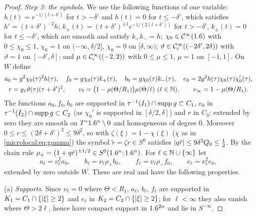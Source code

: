 \begin{proof}
  \emph{Step 3: the symbols.} We use the following functions of one variable:
  $h(t)=e^{-1/(t+\delta')}$ for $t>-\delta'$ and $h(t)=0$ for $t\le-\delta'$, which
  satisfies $h'=(t+\delta')^{-2}h$; $k_\pm(t)=(t+\delta')^{\pm1}e^{-1/(2(t+\delta'))}$ for
  $t>-\delta'$, $k_\pm(t)=0$ for $t\le-\delta'$, which are smooth and satisfy
  $k_+k_-=h$; $\chi_0\in\mathcal{C}^\infty(1.6)$ with $0\le\chi_0\le1$, $\chi_0=1$ on
  $(-\infty,\delta/2]$, $\chi_0=0$ on $[\delta,\infty)$; $\vartheta\in\mathcal{C}^\infty_{\mathrm{c}}((-2\delta',2\delta))$
  with $\vartheta=1$ on $[-\delta',\delta]$; and $\mu\in\mathcal{C}^\infty_{\mathrm{c}}((-2,2))$ with $0\le\mu\le1$,
  $\mu=1$ on $[-1,1]$. On $W$ define
  \begin{gather*}
    a_0=g^2\chi_0(\tau)^2h(\tau),\quad f_0=g\chi_0(\tau)k_+(\tau),\quad
    b_0=g\chi_0(\tau)k_-(\tau),\quad e_0=2g^2h(\tau)\chi_0(\tau)\chi_0'(\tau),\\
    r=g_1\vartheta(\tau)(\tau+\delta')^2,\qquad
    \nu_\ell=\bigl(1-\mu(\Theta/R_1)\bigr)\mu(\Theta/\ell)\ (\ell\in\N),\qquad
    \nu_\infty=1-\mu(\Theta/R_1).
  \end{gather*}
  The functions $a_0,f_0,b_0$ are supported in $\tau^{-1}(I_1)\cap\operatorname{supp} g\subset C_1$,
  $e_0$ in $\tau^{-1}(I_2)\cap\operatorname{supp} g\subset C_2$ (as $\chi_0'$ is supported in
  $[\delta/2,\delta]$) and $r$ in $C_3$; extended by zero they are smooth on
  $T^*1.6^n\setminus0$ and homogeneous of degree $0$. Moreover
  $0\le r\le(2\delta+\delta')^2\le9\delta^2$, so with $\zeta(\xi)=1-\chi(\xi)$ ($\chi$
  as in \eqref{microlocal:eq:gamma}) the symbol $\tilde r=\zeta r\in S^0$
  satisfies $\lvert q\tilde r\rvert\le9\delta^2Q_0\le\frac12$. By the chain rule
  $\rho_\pm=(1+q\tilde r)^{\pm1/2}\in S^0(1.6^n;1.6^n)$. For $\ell\in\mathbb{N}\cup\{\infty\}$
  let
  \begin{equation*}
    a_\ell=\nu_\ell^2a_0,\qquad b_\ell=\nu_\ell\rho_+b_0,\qquad f_\ell=\nu_\ell\rho_-f_0,\qquad
    e_\ell=\nu_\ell^2e_0,
  \end{equation*}
  extended by zero outside $W$. These are real and have the following
  properties.

  (a) \emph{Supports.} Since $\nu_\ell=0$ where $\Theta<R_1$, $a_\ell$, $b_\ell$,
  $f_\ell$ are supported in $K_1=C_1\cap\{\lvert \xi\rvert\ge2\}$ and $e_\ell$ in
  $K_2=C_2\cap\{\lvert \xi\rvert\ge2\}$; for $\ell<\infty$ they also vanish where
  $\Theta>2\ell$, hence have compact support in $1.6^{2n}$ and lie in $S^{-\infty}$.


\end{proof}
